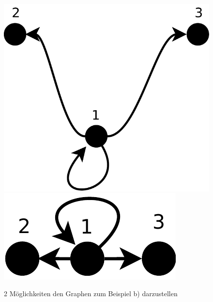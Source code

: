\begin{figure}
\centering
 \includegraphics[scale=0.4]{./bilder/multigraph_bsp_b1.pdf}
 \includegraphics[scale=0.4]{./bilder/multigraph_bsp_b2.pdf}
 \caption{2 Möglichkeiten den Graphen zum Beispiel b) darzustellen}
\end{figure}



